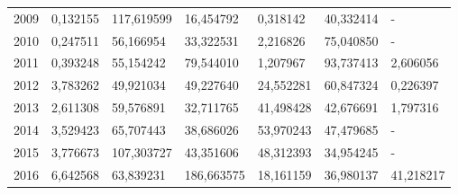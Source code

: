 \begin{table}
\begin{tabular}{p{1cm}p{2cm}p{2cm}p{2cm}p{2cm}p{2cm}p{2cm}}
 2009 &                               0,132155 &                       117,619599 &                 16,454792 &             0,318142 &                         40,332414 &                       - \\
 2010 &                               0,247511 &                        56,166954 &                 33,322531 &             2,216826 &                         75,040850 &                       - \\
 2011 &                               0,393248 &                        55,154242 &                 79,544010 &             1,207967 &                         93,737413 &                2,606056 \\
 2012 &                               3,783262 &                        49,921034 &                 49,227640 &            24,552281 &                         60,847324 &                0,226397 \\
 2013 &                               2,611308 &                        59,576891 &                 32,711765 &            41,498428 &                         42,676691 &                1,797316 \\
 2014 &                               3,529423 &                        65,707443 &                 38,686026 &            53,970243 &                         47,479685 &                       - \\
 2015 &                               3,776673 &                       107,303727 &                 43,351606 &            48,312393 &                         34,954245 &                       - \\
 2016 &                               6,642568 &                        63,839231 &                186,663575 &            18,161159 &                         36,980137 &               41,218217 \\
\bottomrule
\end{tabular}
\end{table}
